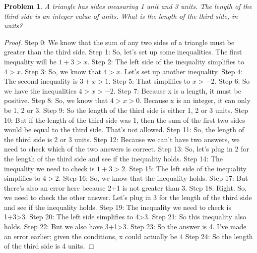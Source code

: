 \documentclass{article}
\newtheorem{theorem}{Problem}
\begin{document}
\begin{theorem}
A triangle has sides measuring 1 unit and 3 units. The length of the third side is an integer value of units. What is the length of the third side, in units?
\end{theorem}

\begin{proof}
Step 0: We know that the sum of any two sides of a triangle must be greater than the third side.
Step 1: So, let's set up some inequalities. The first inequality will be $1+3>x$.
Step 2: The left side of the inequality simplifies to $4>x$.
Step 3: So, we know that $4>x$. Let's set up another inequality.
Step 4: The second inequality is $3+x>1$.
Step 5: That simplifies to $x>-2$.
Step 6: So we have the inequalities $4>x>-2$.
Step 7: Because x is a length, it must be positive.
Step 8: So, we know that $4>x>0$. Because x is an integer, it can only be 1, 2 or 3.
Step 9: So the length of the third side is either 1, 2 or 3 units.
Step 10: But if the length of the third side was 1, then the sum of the first two sides would be equal to the third side. That's not allowed.
Step 11: So, the length of the third side is 2 or 3 units.
Step 12: Because we can't have two answers, we need to check which of the two answers is correct.
Step 13: So, let's plug in 2 for the length of the third side and see if the inequality holds.
Step 14: The inequality we need to check is $1+3>2$.
Step 15: The left side of the inequality simplifies to $4>2$.
Step 16: So, we know that the inequality holds.
Step 17: But there's also an error here because 2+1 is not greater than 3.
Step 18: Right. So, we need to check the other answer. Let's plug in 3 for the length of the third side and see if the inequality holds.
Step 19: The inequality we need to check is 1+3>3.
Step 20: The left side simplifies to 4>3.
Step 21: So this inequality also holds.
Step 22: But we also have 3+1>3.
Step 23: So the answer is 4. I've made an error earlier; given the conditions, x could actually be 4
Step 24: So the length of the third side is 4 units.
\end{proof}
\end{document}
